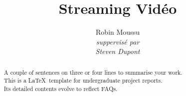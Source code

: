 \documentclass[a4paper,11pt]{custom}
\begin{document}
\title{
  \textrm{
  \textbf{
    \HUGE
    Streaming Vidéo
  }
  }
}
\author{
  \textrm{
    \LARGE
    Robin Moussu
  }
  \\
  \vspace{2ex}
  \textit{
    suppervisé par\\Steven Dupont
  }
}
\maketitle
\begin{abstract}\centering
A couple of sentences on three or four lines to summarise your work.\\ 
This is a \LaTeX\ template for undergraduate project reports.\\
Its detailed contents evolve to reflect FAQs.
\end{abstract}
\tableofcontents





\appendix





\end{document}
